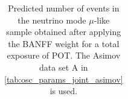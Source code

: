 \begin{table}
\begin{tabular} { | l ||r | r | r | r | r | r | | r | }
\end{tabular}
\caption{
Predicted number of events in the neutrino mode $\mu$-like sample
obtained after applying the BANFF weight
for a total exposure of \TotalPotNuRunOneSevenB{} POT.
The Asimov data set A in \cref{tab:osc_params_joint_asimov} is used.
}
\label{tab:events_1rmu_Asimov_A_Run17b}
\end{table}


